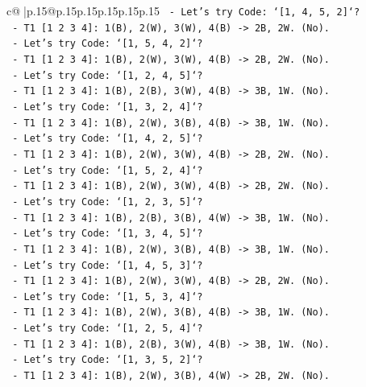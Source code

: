 \documentclass{article}
\begin{document}
{\begin{supertabular}{c@{$\;$}|p{.15\linewidth}@{}p{.15\linewidth}p{.15\linewidth}p{.15\linewidth}p{.15\linewidth}p{.15\linewidth}}
{{{\texttt{    {-} Let's try Code: `{[}1, 4, 5, 2{]}`?} \\
\texttt{        {-} T1 {[}1 2 3 4{]}: 1(B), 2(W), 3(W), 4(B) {-}> 2B, 2W. (No).} \\
\texttt{    {-} Let's try Code: `{[}1, 5, 4, 2{]}`?} \\
\texttt{        {-} T1 {[}1 2 3 4{]}: 1(B), 2(W), 3(W), 4(B) {-}> 2B, 2W. (No).} \\
\texttt{    {-} Let's try Code: `{[}1, 2, 4, 5{]}`?} \\
\texttt{        {-} T1 {[}1 2 3 4{]}: 1(B), 2(B), 3(W), 4(B) {-}> 3B, 1W. (No).} \\
\texttt{    {-} Let's try Code: `{[}1, 3, 2, 4{]}`?} \\
\texttt{        {-} T1 {[}1 2 3 4{]}: 1(B), 2(W), 3(B), 4(B) {-}> 3B, 1W. (No).} \\
\texttt{    {-} Let's try Code: `{[}1, 4, 2, 5{]}`?} \\
\texttt{        {-} T1 {[}1 2 3 4{]}: 1(B), 2(W), 3(W), 4(B) {-}> 2B, 2W. (No).} \\
\texttt{    {-} Let's try Code: `{[}1, 5, 2, 4{]}`?} \\
\texttt{        {-} T1 {[}1 2 3 4{]}: 1(B), 2(W), 3(W), 4(B) {-}> 2B, 2W. (No).} \\
\texttt{    {-} Let's try Code: `{[}1, 2, 3, 5{]}`?} \\
\texttt{        {-} T1 {[}1 2 3 4{]}: 1(B), 2(B), 3(B), 4(W) {-}> 3B, 1W. (No).} \\
\texttt{    {-} Let's try Code: `{[}1, 3, 4, 5{]}`?} \\
\texttt{        {-} T1 {[}1 2 3 4{]}: 1(B), 2(W), 3(B), 4(B) {-}> 3B, 1W. (No).} \\
\texttt{    {-} Let's try Code: `{[}1, 4, 5, 3{]}`?} \\
\texttt{        {-} T1 {[}1 2 3 4{]}: 1(B), 2(W), 3(W), 4(B) {-}> 2B, 2W. (No).} \\
\texttt{    {-} Let's try Code: `{[}1, 5, 3, 4{]}`?} \\
\texttt{        {-} T1 {[}1 2 3 4{]}: 1(B), 2(W), 3(B), 4(B) {-}> 3B, 1W. (No).} \\
\texttt{    {-} Let's try Code: `{[}1, 2, 5, 4{]}`?} \\
\texttt{        {-} T1 {[}1 2 3 4{]}: 1(B), 2(B), 3(W), 4(B) {-}> 3B, 1W. (No).} \\
\texttt{    {-} Let's try Code: `{[}1, 3, 5, 2{]}`?} \\
\texttt{        {-} T1 {[}1 2 3 4{]}: 1(B), 2(W), 3(B), 4(W) {-}> 2B, 2W. (No).} \\
}}}
\end{supertabular}}
\end{document}
